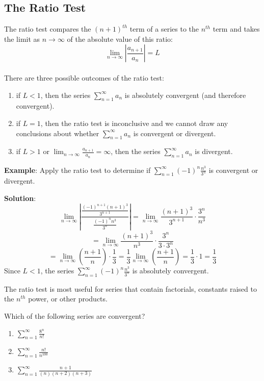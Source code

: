 \subsection{The Ratio Test}
The ratio test compares the $(n + 1)^{th}$ term of a series 
to the $n^{th}$ term and takes the limit as $n \to \infty$ of the absolute 
value of this ratio:
$$\lim_{n \to \infty} \left| \frac{a_{n + 1}}{a_n} \right| = L$$\\
There are three possible outcomes of the ratio test:
\begin{enumerate}
\item if $L < 1$, then the series $\sum_{n=1}^\infty a_n$ is absolutely 
convergent (and therefore convergent).
\item if $L = 1$, then the ratio test is inconclusive and we cannot draw any 
conclusions about whether $\sum_{n=1}^\infty a_n$ is convergent or divergent.
\item if $L > 1$ or $\lim_{n \to \infty} \frac{a_{n + 1}}{a_n} = \infty$, then 
the series $\sum_{n=1}^\infty a_n$ is divergent.
\end{enumerate}

\textbf{Example}: Apply the ratio test to determine if $\sum_{n=1}^\infty 
(-1)^n \frac{n^3}{3^n}$ is convergent or divergent. 

\textbf{Solution}: 
$$\lim_{n \to \infty} \left| \frac{\frac{(-1)^{n + 1}(n + 1)^3}{3^{n + 1}}}{
\frac{(-1)^n n^3}{3^n}} \right| = \lim_{n \to \infty} \frac{(n + 1)^3}{3^{n + 
1}} \cdot \frac{3^n}{n^3}$$
$$= \lim_{n \to \infty} \frac{(n + 1)^3}{n^3} \cdot \frac{3^n}{3 \cdot 3^n}$$
$$= \lim_{n \to \infty} \left( \frac{n + 1}{n} \right) \cdot \frac{1}{3} = 
\frac{1}{3} \lim_{n \to \infty} \left( \frac{n + 1}{n} \right) = \frac{1}{3} 
\cdot 1 = \frac{1}{3} $$
Since $L < 1$, the series $\sum_{n=1}^\infty (-1)^n \frac{n^3}{3^n}$ is 
absolutely convergent. 

The ratio test is most useful for series that contain factorials, constants 
raised to the $n^{th}$ power, or other products. 

\begin{Exercise} Which of the following series are 
convergent?
\begin{enumerate}
\item $\sum_{n=1}^\infty \frac{8^n}{n!}$
\item $\sum_{n=1}^\infty \frac{n!}{n^{100}}$
\item $\sum_{n=1}^\infty \frac{n + 1}{(n)(n+2)(n+3)}$
\end{enumerate}
\end{Exercise}

